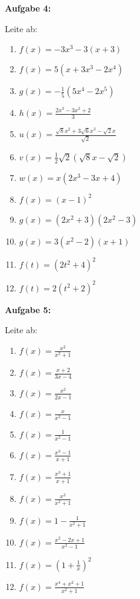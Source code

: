\documentclass[a4paper,12pt]{article}
\newcommand{\Aufgabe}[1]{
  {
  \vspace*{0.5cm}
  \textsf{\textbf{Aufgabe #1}}
  \vspace*{0.2cm}
  
  }
}
\begin{document}
\enlargethispage{2\baselineskip}
\vspace{1cm}
\Aufgabe{4:}
Leite ab:
\begin{enumerate}[label={\alph*)}, topsep=5pt,itemsep=4ex,partopsep=1ex,parsep=1ex]
  \item $f(x)=-3x^3-3(x+3)$
  \item $f(x)=5(x+3x^3-2x^4)$
  \item $g(x)=-\frac{1}{5}(5x^4-2x^5)$
  \item $h(x)=\frac{2x^3-3x^2+2}{3}$
  \item $u(x)=\frac{\sqrt{8}x^2+3\sqrt{6}x^3-\sqrt{2}x}{\sqrt{2}}$
  \item $v(x)=\frac{1}{2}\sqrt{2}(\sqrt{8}x-\sqrt{2})$
  \item $w(x)=x(2x^3-3x+4)$
  \item $f(x)=(x-1)^2$
  \item $g(x)=(2x^2+3)(2x^2-3)$
  \item $g(x)=3(x^2-2)(x+1)$
  \item $f(t)=(2t^2+4)^2$
  \item $f(t)=2(t^2+2)^2$
\end{enumerate}

\enlargethispage{2\baselineskip}

\Aufgabe{5:}
Leite ab:
\begin{enumerate}[label={\alph*)}, topsep=5pt,itemsep=4ex,partopsep=1ex,parsep=1ex]
  \item $f(x)=\frac{x^2}{x^2+1}$
  \item $f(x)=\frac{x+2}{3x-4}$
  \item $f(x)=\frac{x^2}{2x-1}$
  \item $f(x)=\frac{x}{x^2-1}$
  \item $f(x)=\frac{1}{x^2-1}$
  \item $f(x)=\frac{x^3-1}{x+1}$
  \item $f(x)=\frac{x^3+1}{x+1}$
  \item $f(x)=\frac{x^3}{x^2+1}$
  \item $f(x)=1-\frac{1}{x^2+1}$
  \item $f(x)=\frac{x^2-2x+1}{x^2-1}$
  \item $f(x)=(1+\frac{1}{x})^2$
  \item $f(x)=\frac{x^4+x^2+1}{x^2+1}$
\end{enumerate}
\end{document}
